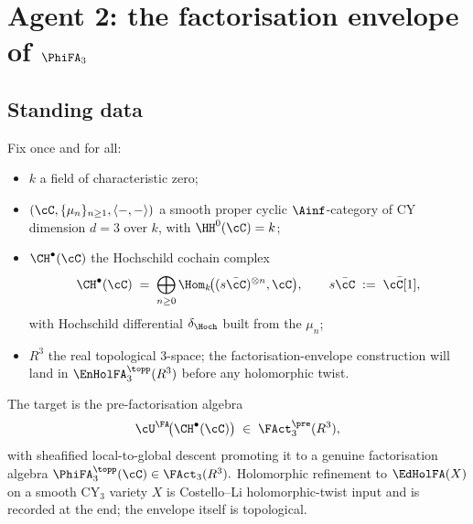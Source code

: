 %
%
%

\chapter*{Agent 2: the factorisation envelope of $\PhiFA_3$}

\section*{Standing data}

Fix once and for all:

\begin{itemize}
\item $k$ a field of characteristic zero;
\item $(\cC,\{\mu_n\}_{n\geq 1},\langle-,-\rangle)$ a smooth proper cyclic
$\Ainf$-category of CY dimension $d=3$ over $k$, with
$\HH^0(\cC)=k$;
\item $\CH^\bullet(\cC)$ the Hochschild cochain complex
\[
\CH^\bullet(\cC)\;=\;\bigoplus_{n\geq 0}
\Hom_k\!\bigl((s\bar\cC)^{\otimes n},\cC\bigr),
\qquad s\bar\cC\;:=\;\bar\cC[1],
\]
with Hochschild differential $\delta_\Hoch$ built from the $\mu_n$;
\item $R^3$ the real topological $3$-space; the factorisation-envelope
construction will land in $\EnHolFA_3^{\topp}(R^3)$ before any holomorphic
twist.
\end{itemize}

The target is the pre-factorisation algebra
\[
\cU^\FA\!\bigl(\CH^\bullet(\cC)\bigr)\;\in\;\FAct^\pre_3(R^3),
\]
with sheafified local-to-global descent promoting it to a genuine
factorisation algebra
\(
\PhiFA_3^\topp(\cC)\in\FAct_3(R^3).
\)
Holomorphic refinement to $\EdHolFA(X)$ on a smooth CY$_3$ variety $X$ is
Costello--Li holomorphic-twist input and is recorded at the end;
the envelope itself is topological.

